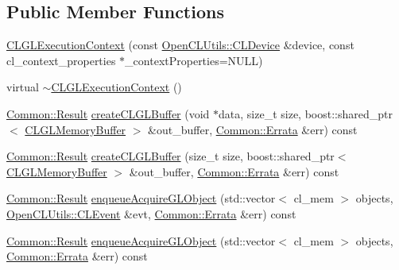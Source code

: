 \subsection*{Public Member Functions}
\begin{DoxyCompactItemize}
\item 
\hyperlink{class_c_l_ray_tracer_1_1_c_l_g_l_interop_1_1_c_l_g_l_execution_context_af723c8184d47e2a41f72cb2690824121}{C\+L\+G\+L\+Execution\+Context} (const \hyperlink{class_c_l_ray_tracer_1_1_open_c_l_utils_1_1_c_l_device}{Open\+C\+L\+Utils\+::\+C\+L\+Device} \&device, const cl\+\_\+context\+\_\+properties $\ast$\+\_\+context\+Properties=N\+U\+LL)
\item 
virtual \hyperlink{class_c_l_ray_tracer_1_1_c_l_g_l_interop_1_1_c_l_g_l_execution_context_a177101743f53442a579e33864368458a}{$\sim$\+C\+L\+G\+L\+Execution\+Context} ()
\item 
\hyperlink{_errata_8h_a389396702f1aff6e71eb21328b0775c1}{Common\+::\+Result} \hyperlink{class_c_l_ray_tracer_1_1_c_l_g_l_interop_1_1_c_l_g_l_execution_context_a9168c916f733e28118b0f19acb97573e}{create\+C\+L\+G\+L\+Buffer} (void $\ast$data, size\+\_\+t size, boost\+::shared\+\_\+ptr$<$ \hyperlink{class_c_l_ray_tracer_1_1_c_l_g_l_interop_1_1_c_l_g_l_memory_buffer}{C\+L\+G\+L\+Memory\+Buffer} $>$ \&out\+\_\+buffer, \hyperlink{class_c_l_ray_tracer_1_1_common_1_1_errata}{Common\+::\+Errata} \&err) const 
\item 
\hyperlink{_errata_8h_a389396702f1aff6e71eb21328b0775c1}{Common\+::\+Result} \hyperlink{class_c_l_ray_tracer_1_1_c_l_g_l_interop_1_1_c_l_g_l_execution_context_ada8a14d2f88ff743e65242a39536cf5e}{create\+C\+L\+G\+L\+Buffer} (size\+\_\+t size, boost\+::shared\+\_\+ptr$<$ \hyperlink{class_c_l_ray_tracer_1_1_c_l_g_l_interop_1_1_c_l_g_l_memory_buffer}{C\+L\+G\+L\+Memory\+Buffer} $>$ \&out\+\_\+buffer, \hyperlink{class_c_l_ray_tracer_1_1_common_1_1_errata}{Common\+::\+Errata} \&err) const 
\item 
\hyperlink{_errata_8h_a389396702f1aff6e71eb21328b0775c1}{Common\+::\+Result} \hyperlink{class_c_l_ray_tracer_1_1_c_l_g_l_interop_1_1_c_l_g_l_execution_context_a6aa0a4371ced825dbf1ad15bc731c344}{enqueue\+Acquire\+G\+L\+Object} (std\+::vector$<$ cl\+\_\+mem $>$ objects, \hyperlink{class_c_l_ray_tracer_1_1_open_c_l_utils_1_1_c_l_event}{Open\+C\+L\+Utils\+::\+C\+L\+Event} \&evt, \hyperlink{class_c_l_ray_tracer_1_1_common_1_1_errata}{Common\+::\+Errata} \&err) const 
\item 
\hyperlink{_errata_8h_a389396702f1aff6e71eb21328b0775c1}{Common\+::\+Result} \hyperlink{class_c_l_ray_tracer_1_1_c_l_g_l_interop_1_1_c_l_g_l_execution_context_ab10596b7db9da5e60e095a6d5ed91ce4}{enqueue\+Acquire\+G\+L\+Object} (std\+::vector$<$ cl\+\_\+mem $>$ objects, \hyperlink{class_c_l_ray_tracer_1_1_common_1_1_errata}{Common\+::\+Errata} \&err) const 

\end{DoxyCompactItemize}

